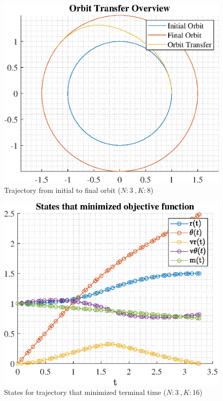 \documentclass[]{article}
\begin{document}
\begin{figure}
	\centering
	\includegraphics[scale=0.75]{orbit_N3_K8_C2_tf.eps}
	\caption{Trajectory from initial to final orbit (\(N:3\ , K:8\))}
	\label{fig:orbit_N3_K8_C2_tf}
\end{figure}
\begin{figure}
	\centering
	\includegraphics[scale=0.75]{states_N3_K16_C2_tf.eps}
	\caption{States for trajectory that minimized terminal time (\(N:3\ , K:16\))}
	\label{fig:states_N3_K16_C2_tf}
\end{figure}
\end{document}
